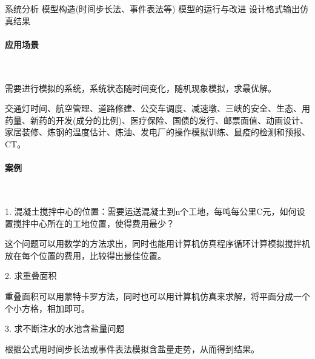系统分析 \rightarrow 模型构造(时间步长法、事件表法等) \rightarrow 模型的运行与改进 \rightarrow 设计格式输出仿真结果

\paragraph{应用场景}~{}

需要进行模拟的系统，系统状态随时间变化，随机现象模拟，求最优解。

交通灯时间、航空管理、道路修建、公交车调度、减速墩、三峡的安全、生态、用药量、新药的开发(成分的比例)、医疗保险、国债的发行、邮票面值、动画设计、家居装修、炼钢的温度估计、炼油、发电厂的操作模拟训练、鼠疫的检测和预报、CT。

\paragraph{案例}~{}

1. 混凝土搅拌中心的位置：需要运送混凝土到n个工地，每吨每公里C元，如何设置搅拌中心所在的工地位置，使得费用最少？

这个问题可以用数学的方法求出，同时也能用计算机仿真程序循环计算模拟搅拌机放在每个位置的费用，比较得出最佳位置。

2. 求重叠面积

重叠面积可以用蒙特卡罗方法，同时也可以用计算机仿真来求解，将平面分成一个个小方格，相加即可。

3. 求不断注水的水池含盐量问题

根据公式用时间步长法或事件表法模拟含盐量走势，从而得到结果。
